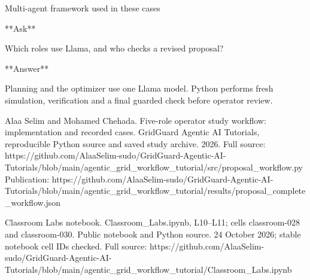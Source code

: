 \begin{frame}[t]{Multi-agent framework used in these cases}
{**Ask**

Which roles use Llama, and who checks a revised proposal?

**Answer**

Planning and the optimizer use one Llama model. Python performs fresh simulation, verification and a final guarded check before operator review.

Alaa Selim and Mohamed Chehada. Five-role operator study workflow: implementation and recorded cases. GridGuard Agentic AI Tutorials, reproducible Python source and saved study archive. 2026.
Full source: https://github.c\allowbreak{}om/AlaaSelim-sud\allowbreak{}o/GridGuard-Agen\allowbreak{}tic-AI-Tutorials\allowbreak{}/blob/main/agent\allowbreak{}ic\_grid\_workflow\allowbreak{}\_tutorial/src/pr\allowbreak{}oposal\_workflow.\allowbreak{}py
Publication: https://github.c\allowbreak{}om/AlaaSelim-sud\allowbreak{}o/GridGuard-Agen\allowbreak{}tic-AI-Tutorials\allowbreak{}/blob/main/agent\allowbreak{}ic\_grid\_workflow\allowbreak{}\_tutorial/result\allowbreak{}s/proposal\_compl\allowbreak{}ete\_workflow.jso\allowbreak{}n

Classroom Labs notebook. Classroom\_Labs.ipynb, L10--L11; cells classroom-028 and classroom-030. Public notebook and Python source. 24 October 2026; stable notebook cell IDs checked.
Full source: https://github.c\allowbreak{}om/AlaaSelim-sud\allowbreak{}o/GridGuard-Agen\allowbreak{}tic-AI-Tutorials\allowbreak{}/blob/main/agent\allowbreak{}ic\_grid\_workflow\allowbreak{}\_tutorial/Classr\allowbreak{}oom\_Labs.ipynb}
\end{frame}

